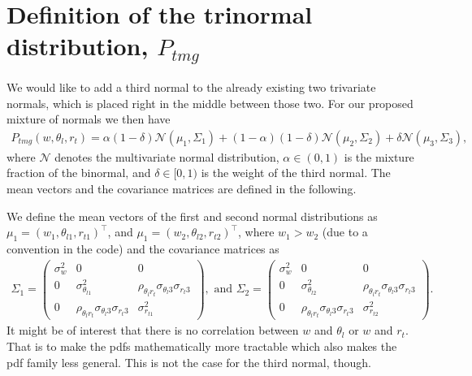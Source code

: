 \section{Definition of the trinormal distribution, \texorpdfstring{$P_{tmg}$}{P tmg}}
\label{sec:definition-of-the-trinormal-distribution-p_tmg}

We would like to add a third normal to the already existing two trivariate normals,
which is placed right in the middle between those two.
For our proposed mixture of normals we then have
\begin{align}
    \label{eq:normal_mix_pdf}
    P_{tmg}(w, \theta_l, r_t)
    = \alpha (1-\delta) \mathcal{N}(\mu_1, \Sigma_1)
    + (1-\alpha) (1-\delta) \mathcal{N}(\mu_2, \Sigma_2)
    + \delta \mathcal{N}(\mu_3, \Sigma_3),
\end{align}
where $\mathcal{N}$ denotes the multivariate normal distribution,
$\alpha \in (0,1)$ is the mixture fraction of the binormal,
and $\delta \in [0,1)$ is the weight of the third normal.
The mean vectors and the covariance matrices are defined in the following.

We define the mean vectors of the first
and second normal distributions as $\mu_1 = (w_1, \theta_{l1}, r_{t1})^\top$,
and $\mu_1 = (w_2, \theta_{l2}, r_{t2})^\top$,
where $w_1 > w_2$ (due to a convention in the code) and the covariance matrices as
\begin{align}
    \Sigma_1 =
    \begin{pmatrix}
        \sigma_w^2 & 0                                                      & 0                                                      \\
        0          & \sigma_{\theta_{l1}}^2                                 & \rho_{\theta_l r_t} \sigma_{\theta_l 3} \sigma_{r_t 3} \\
        0          & \rho_{\theta_l r_t} \sigma_{\theta_l 3} \sigma_{r_t 3} & \sigma_{r_{t1}}^2
    \end{pmatrix},
    \text{ and }
    \Sigma_2 =
    \begin{pmatrix}
        \sigma_w^2 & 0                                                      & 0                                                      \\
        0          & \sigma_{\theta_{l2}}^2                                 & \rho_{\theta_l r_t} \sigma_{\theta_l 3} \sigma_{r_t 3} \\
        0          & \rho_{\theta_l r_t} \sigma_{\theta_l 3} \sigma_{r_t 3} & \sigma_{r_{t2}}^2
    \end{pmatrix}.
\end{align}
It might be of interest that there is no correlation between $w$ and $\theta_l$ or $w$ and $r_t$.
That is to make the \glspl{pdf} mathematically more tractable which also makes the \gls{pdf} family less general.
This is not the case for the third normal, though.

